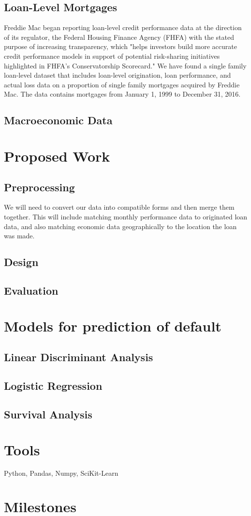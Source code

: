 \documentclass[sigconf]{acmart}
\begin{document}
\subsection{Loan-Level Mortgages}
Freddie Mac began reporting loan-level credit performance data at the direction of its regulator, the Federal Housing Finance Agency (FHFA) with the stated purpose of increasing transparency, which "helps investors build more accurate credit performance models in support of potential risk-sharing initiatives highlighted in FHFA's Conservatorship Scorecard." We have found a single family loan-level dataset that includes loan-level origination, loan performance, and actual loss data on a proportion of single family mortgages acquired by Freddie Mac. The data contains mortgages from January 1, 1999 to December 31, 2016. 
\subsection{Macroeconomic Data}

\section{Proposed Work}
\subsection{Preprocessing}
We will need to convert our data into compatible forms and then merge them together. This will include matching monthly performance data to originated loan data, and also matching economic data geographically to the location the loan was made.
\subsection{Design}
\subsection{Evaluation}

\section{Models for prediction of default}
\subsection{Linear Discriminant Analysis}
\subsection{Logistic Regression}
\subsection{Survival Analysis}

\section{Tools}
Python, Pandas, Numpy, SciKit-Learn
\section{Milestones}
\end{document}
